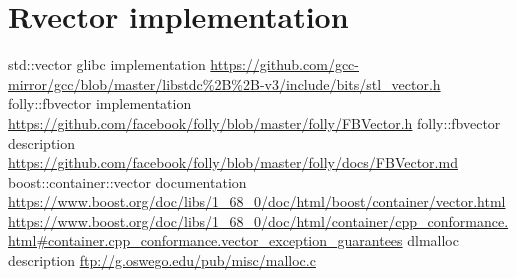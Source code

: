 \documentclass[declaration, inz, english, shortabstract]{iithesis}
\begin{document}
\chapter{Rvector implementation}



\begin{thebibliography}{1}
 std::vector glibc implementation \url{https://github.com/gcc-mirror/gcc/blob/master/libstdc%2B%2B-v3/include/bits/stl_vector.h}
 folly::fbvector implementation \url{https://github.com/facebook/folly/blob/master/folly/FBVector.h}
 folly::fbvector description \url{https://github.com/facebook/folly/blob/master/folly/docs/FBVector.md}
 boost::container::vector documentation \url{https://www.boost.org/doc/libs/1_68_0/doc/html/boost/container/vector.html}
 \url{https://www.boost.org/doc/libs/1_68_0/doc/html/container/cpp_conformance.html#container.cpp_conformance.vector_exception_guarantees}
 dlmalloc description \url{ftp://g.oswego.edu/pub/misc/malloc.c}
\end{thebibliography}
\end{document}

